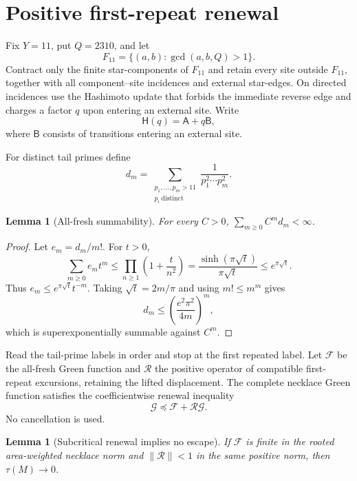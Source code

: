 \documentclass[11pt]{article}
\newtheorem{lemma}[theorem]{Lemma}
\theoremstyle{definition}
\theoremstyle{remark}
\begin{document}
\section{Positive first-repeat renewal}

Fix $Y=11$, put $Q=2310$, and let
\[
 F_{11}=\{(a,b):\gcd(a,b,Q)>1\}.
\]
Contract only the finite star-components of $F_{11}$ and retain every site
outside $F_{11}$, together with all component--site incidences and external
star-edges.  On directed incidences use the Hashimoto update that forbids the
immediate reverse edge and charges a factor $q$ upon entering an external
site.  Write
\[
 \mathsf H(q)=\mathsf A+q\mathsf B,
\]
where $\mathsf B$ consists of transitions entering an external site.

For distinct tail primes define
\[
 d_m=\sum_{\substack{p_1,\ldots,p_m>11\\p_i\ \mathrm{distinct}}}
       \frac1{p_1^2\cdots p_m^2}.
\]

\begin{lemma}[All-fresh summability]
\label{lem:fresh-prime-summability}
For every $C>0$, $\sum_{m\geq0}C^m d_m<\infty$.
\end{lemma}

\begin{proof}
Let $e_m=d_m/m!$.  For $t>0$,
\[
 \sum_{m\geq0}e_mt^m
 \leq\prod_{n\geq1}\left(1+\frac{t}{n^2}\right)
 =\frac{\sinh(\pi\sqrt t)}{\pi\sqrt t}
 \leq e^{\pi\sqrt t}.
\]
Thus $e_m\leq e^{\pi\sqrt t}t^{-m}$.  Taking
$\sqrt t=2m/\pi$ and using $m!\leq m^m$ gives
\[
 d_m\leq\left(\frac{e^2\pi^2}{4m}\right)^m,
\]
which is superexponentially summable against $C^m$.
\end{proof}

Read the tail-prime labels in order and stop at the first repeated label.
Let $\mathcal F$ be the all-fresh Green function and $\mathcal R$ the positive
operator of compatible first-repeat excursions, retaining the lifted
displacement.  The complete necklace Green function satisfies the
coefficientwise renewal inequality
\begin{equation}
\label{eq:first-repeat-renewal}
 \mathcal G\preccurlyeq\mathcal F+\mathcal R\mathcal G.
\end{equation}
No cancellation is used.

\begin{lemma}[Subcritical renewal implies no escape]
\label{lem:renewal-no-escape}
If $\mathcal F$ is finite in the rooted area-weighted necklace norm and
$\|\mathcal R\|<1$ in the same positive norm, then $\tau(M)\to0$.
\end{lemma}
\end{document}
